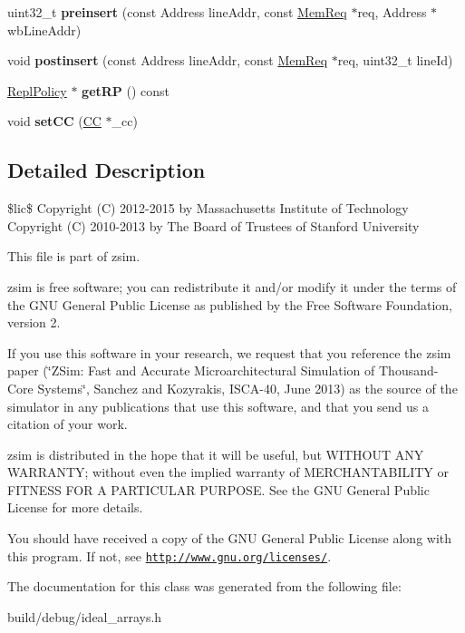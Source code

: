 \begin{DoxyCompactItemize}
\item 
\hypertarget{classIdealLRUArray_a1bbd715a516bd619a7616278af19c835}{uint32\-\_\-t {\bfseries preinsert} (const Address line\-Addr, const \hyperlink{structMemReq}{Mem\-Req} $\ast$req, Address $\ast$wb\-Line\-Addr)}\label{classIdealLRUArray_a1bbd715a516bd619a7616278af19c835}

\item 
\hypertarget{classIdealLRUArray_a7bb8b248770283b7083a242d825ff795}{void {\bfseries postinsert} (const Address line\-Addr, const \hyperlink{structMemReq}{Mem\-Req} $\ast$req, uint32\-\_\-t line\-Id)}\label{classIdealLRUArray_a7bb8b248770283b7083a242d825ff795}

\item 
\hypertarget{classIdealLRUArray_ab4ed72c6342be5ff2e6c47bab63068ce}{\hyperlink{classReplPolicy}{Repl\-Policy} $\ast$ {\bfseries get\-R\-P} () const }\label{classIdealLRUArray_ab4ed72c6342be5ff2e6c47bab63068ce}

\item 
\hypertarget{classIdealLRUArray_a7dfad52e5897a8816334c038d103fd3a}{void {\bfseries set\-C\-C} (\hyperlink{classCC}{C\-C} $\ast$\-\_\-cc)}\label{classIdealLRUArray_a7dfad52e5897a8816334c038d103fd3a}

\end{DoxyCompactItemize}


\subsection{Detailed Description}
\$lic\$ Copyright (C) 2012-\/2015 by Massachusetts Institute of Technology Copyright (C) 2010-\/2013 by The Board of Trustees of Stanford University

This file is part of zsim.

zsim is free software; you can redistribute it and/or modify it under the terms of the G\-N\-U General Public License as published by the Free Software Foundation, version 2.

If you use this software in your research, we request that you reference the zsim paper (\char`\"{}\-Z\-Sim\-: Fast and Accurate Microarchitectural Simulation of
\-Thousand-\/\-Core Systems\char`\"{}, Sanchez and Kozyrakis, I\-S\-C\-A-\/40, June 2013) as the source of the simulator in any publications that use this software, and that you send us a citation of your work.

zsim is distributed in the hope that it will be useful, but W\-I\-T\-H\-O\-U\-T A\-N\-Y W\-A\-R\-R\-A\-N\-T\-Y; without even the implied warranty of M\-E\-R\-C\-H\-A\-N\-T\-A\-B\-I\-L\-I\-T\-Y or F\-I\-T\-N\-E\-S\-S F\-O\-R A P\-A\-R\-T\-I\-C\-U\-L\-A\-R P\-U\-R\-P\-O\-S\-E. See the G\-N\-U General Public License for more details.

You should have received a copy of the G\-N\-U General Public License along with this program. If not, see \href{http://www.gnu.org/licenses/}{\tt http\-://www.\-gnu.\-org/licenses/}. 

The documentation for this class was generated from the following file\-:\begin{DoxyCompactItemize}
\item 
build/debug/ideal\-\_\-arrays.\-h\end{DoxyCompactItemize}
